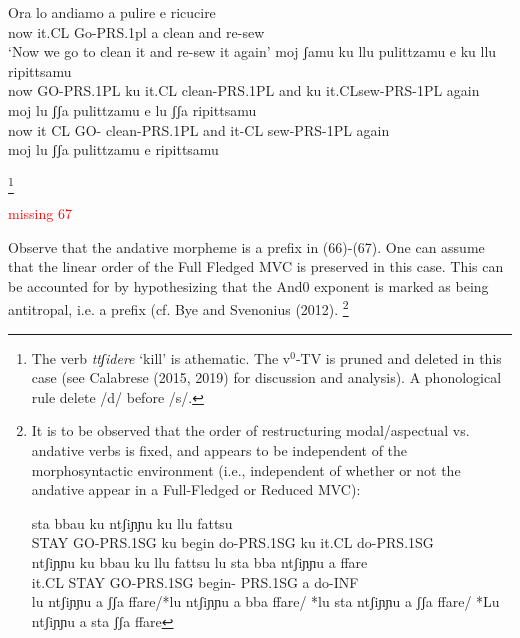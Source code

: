 \documentclass[output=paper,colorlinks,citecolor=brown,
]{langscibook}
\begin{document}
{\ea
    \ea \gll Ora lo andiamo a pulire e ricucire \\
 now it.CL Go-PRS.1pl a clean and re-sew\\
    \glt ‘Now we go to clean it and re-sew it again’
    \ex \gll moj  ʃamu      ku llu    pulittzamu     e   ku llu ripittsamu\\
 now GO-PRS.1PL ku  it.CL clean-PRS.1PL and ku it.CLsew-PRS-1PL again\\
    \ex \gll moj lu   ʃʃa  pulittzamu    e    lu  ʃʃa ripittsamu\\
 now it CL  GO- clean-PRS.1PL and it-CL sew-PRS-1PL again\\
    \ex *moj lu ʃʃa pulittzamu e  ripittsamu
    \z
\z

}
\footnote{The verb \textit{ttʃidere} ‘kill’ is athematic. The v$^0$-TV is pruned and deleted in this case (see Calabrese (2015, 2019) for discussion and analysis).  A phonological rule delete /d/ before /s/.
}

\ea
\textcolor{red}{missing 67}
\z

Observe that the andative morpheme is a prefix in (66)-(67).  One can assume that the linear order of the Full Fledged MVC is preserved in this case.  This can be accounted for by hypothesizing that the And0 exponent is marked as being antitropal, i.e. a prefix (cf. Bye and Svenonius (2012).
\footnote{It is to be observed that the order of restructuring modal/aspectual vs. andative verbs is fixed, and appears to be independent of the morphosyntactic environment (i.e., independent of whether or not the andative appear in a Full-Fledged or Reduced MVC):

\ea
    \ea \gll sta bbau   ku ntʃiɲɲu   ku llu  fattsu\\
STAY GO-PRS.1SG ku  begin do-PRS.1SG  ku it.CL do-PRS.1SG\\
\glt *ntʃiɲɲu ku bbau ku llu fattsu
    \ex \gll lu  sta  bba   ntʃiɲɲu      a   ffare\\
it.CL  STAY GO-PRS.1SG begin- PRS.1SG  a   do-INF\\
\glt *lu ntʃiɲɲu a ʃʃa ffare/*lu ntʃiɲɲu a bba ffare/ *lu sta ntʃiɲɲu a ʃʃa ffare/ *Lu  ntʃiɲɲu a sta ʃʃa ffare
    \z
\z

}
\end{document}
